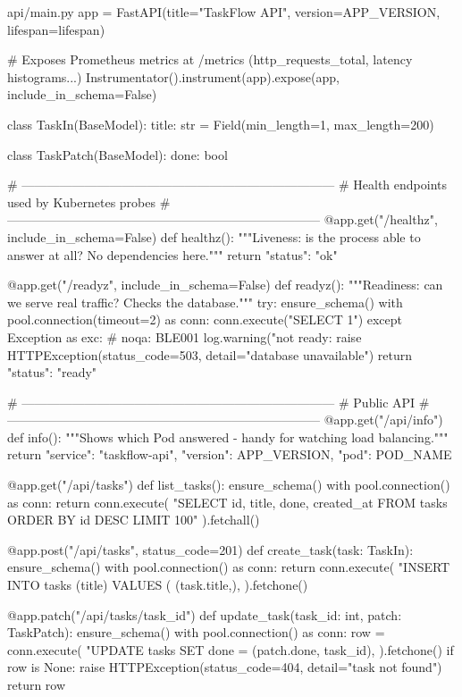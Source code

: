 \begin{pycode}{api/main.py}
app = FastAPI(title="TaskFlow API", version=APP_VERSION, lifespan=lifespan)

# Exposes Prometheus metrics at /metrics (http_requests_total, latency histograms...)
Instrumentator().instrument(app).expose(app, include_in_schema=False)


class TaskIn(BaseModel):
    title: str = Field(min_length=1, max_length=200)


class TaskPatch(BaseModel):
    done: bool


# ---------------------------------------------------------------------------
# Health endpoints used by Kubernetes probes
# ---------------------------------------------------------------------------
@app.get("/healthz", include_in_schema=False)
def healthz():
    """Liveness: is the process able to answer at all? No dependencies here."""
    return {"status": "ok"}


@app.get("/readyz", include_in_schema=False)
def readyz():
    """Readiness: can we serve real traffic? Checks the database."""
    try:
        ensure_schema()
        with pool.connection(timeout=2) as conn:
            conn.execute("SELECT 1")
    except Exception as exc:  # noqa: BLE001
        log.warning("not ready: %
        raise HTTPException(status_code=503, detail="database unavailable")
    return {"status": "ready"}


# ---------------------------------------------------------------------------
# Public API
# ---------------------------------------------------------------------------
@app.get("/api/info")
def info():
    """Shows which Pod answered - handy for watching load balancing."""
    return {"service": "taskflow-api", "version": APP_VERSION, "pod": POD_NAME}


@app.get("/api/tasks")
def list_tasks():
    ensure_schema()
    with pool.connection() as conn:
        return conn.execute(
            "SELECT id, title, done, created_at FROM tasks ORDER BY id DESC LIMIT 100"
        ).fetchall()


@app.post("/api/tasks", status_code=201)
def create_task(task: TaskIn):
    ensure_schema()
    with pool.connection() as conn:
        return conn.execute(
            "INSERT INTO tasks (title) VALUES (%
            (task.title,),
        ).fetchone()


@app.patch("/api/tasks/{task_id}")
def update_task(task_id: int, patch: TaskPatch):
    ensure_schema()
    with pool.connection() as conn:
        row = conn.execute(
            "UPDATE tasks SET done = %
            (patch.done, task_id),
        ).fetchone()
    if row is None:
        raise HTTPException(status_code=404, detail="task not found")
    return row



\end{pycode}
